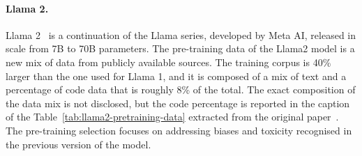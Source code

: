 \paragraph{Llama 2.}
\label{par:llama-2}

Llama 2~\cite{touvron2023llama2} is a continuation of the Llama series, developed by Meta AI, released in scale from 7B to 70B parameters.
The pre-training data of the Llama2 model is a new mix of data from publicly available sources.
The training corpus is 40\% larger than the one used for Llama 1, and it is composed of a mix of text and a percentage of code data that is roughly 8\% of the total.
The exact composition of the data mix is not disclosed, but the code percentage is reported in the caption of the Table~\ref{tab:llama2-pretraining-data} extracted from the original paper~\cite{touvron2023llama2}.
The pre-training selection focuses on addressing biases and toxicity recognised in the previous version of the model.

